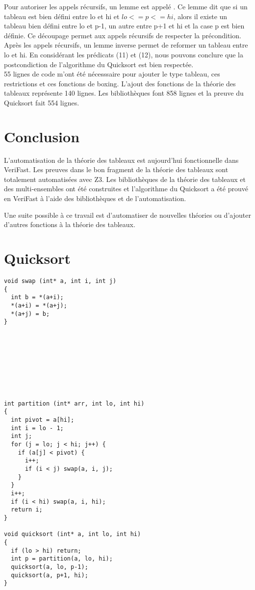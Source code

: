 \documentclass[11pt,openany]{article}
\newcommand{\verifast}{VeriFast}
\begin{document}
		Pour autoriser les appels r\'ecursifs, un lemme est appel\'e . Ce lemme dit que si un tableau est bien d\'efini entre lo et hi et $lo <= p<=hi$, alors il existe un tableau bien d\'efini entre lo et p-1, un autre entre p+1 et hi et la case p est bien d\'efinie. Ce d\'ecoupage permet aux appels r\'ecursifs de respecter la pr\'econdition. Apr\`es les appels r\'ecursifs, un lemme inverse permet de reformer un tableau entre lo et hi. En consid\'erant les pr\'edicats (11) et (12), nous pouvons conclure que la postcondiction de l'algorithme du Quicksort est bien respect\'ee. \\
		
	55 lignes de code m'ont \'et\'e n\'ecesssaire pour ajouter le type tableau, ces restrictions et ces fonctions de boxing. L'ajout des fonctions de la th\'eorie des tableaux repr\'esente 140 lignes. Les biblioth\`eques font 858 lignes et la preuve du Quicksort fait 554 lignes. 
	
\section{Conclusion}
	
	L'automatisation de la th\'eorie des tableaux est aujourd'hui fonctionnelle dans \verifast. Les preuves dans le bon fragment de la th\'eorie des tableaux sont totalement automatis\'ees avec Z3. Les biblioth\`eques de la th\'eorie des tableaux et des multi-ensembles ont \'et\'e construites et l'algorithme du Quicksort a \'et\'e prouv\'e en \verifast{} \`a l'aide des biblioth\`eques et de l'automatisation. 
	
	Une suite possible \`a ce travail est d'automatiser de nouvelles th\'eories ou d'ajouter d'autres fonctions \`a la th\'eorie des tableaux.





\appendix
\section*{Quicksort}
\begin{lstlisting}
void swap (int* a, int i, int j)
{
  int b = *(a+i);
  *(a+i) = *(a+j);
  *(a+j) = b;
}









int partition (int* arr, int lo, int hi)
{
  int pivot = a[hi];
  int i = lo - 1;
  int j;
  for (j = lo; j < hi; j++) {
    if (a[j] < pivot) {
      i++;
      if (i < j) swap(a, i, j);
    }
  }
  i++;
  if (i < hi) swap(a, i, hi);
  return i;
}

void quicksort (int* a, int lo, int hi)
{
  if (lo > hi) return;
  int p = partition(a, lo, hi);
  quicksort(a, lo, p-1);
  quicksort(a, p+1, hi);
}

		\end{lstlisting}
\end{document}
